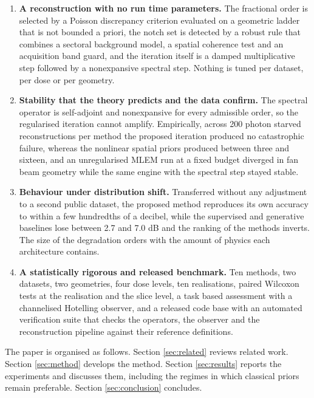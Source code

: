 \begin{enumerate}
\item \textbf{A reconstruction with no run time parameters.} The fractional
order is selected by a Poisson discrepancy criterion evaluated on a geometric
ladder that is not bounded a priori, the notch set is detected by a robust
rule that combines a sectoral background model, a spatial coherence test and
an acquisition band guard, and the iteration itself is a damped
multiplicative step followed by a nonexpansive spectral step. Nothing is
tuned per dataset, per dose or per geometry.

\item \textbf{Stability that the theory predicts and the data confirm.} The
spectral operator is self-adjoint and nonexpansive for every admissible
order, so the regularised iteration cannot amplify. Empirically, across 200
photon starved reconstructions per method the proposed iteration produced no
catastrophic failure, whereas the nonlinear spatial priors produced between
three and sixteen, and an unregularised MLEM run at a fixed budget diverged
in fan beam geometry while the same engine with the spectral step stayed
stable.

\item \textbf{Behaviour under distribution shift.} Transferred without any
adjustment to a second public dataset, the proposed method reproduces its own
accuracy to within a few hundredths of a decibel, while the supervised and
generative baselines lose between 2.7 and 7.0 dB and the ranking of the
methods inverts. The size of the degradation orders with the amount of
physics each architecture contains.

\item \textbf{A statistically rigorous and released benchmark.} Ten methods,
two datasets, two geometries, four dose levels, ten realisations, paired
Wilcoxon tests at the realisation and the slice level, a task based
assessment with a channelised Hotelling observer, and a released code base
with an automated verification suite that checks the operators, the observer
and the reconstruction pipeline against their reference definitions.
\end{enumerate}

The paper is organised as follows. Section \ref{sec:related} reviews related
work. Section \ref{sec:method} develops the method. Section
\ref{sec:results} reports the experiments and discusses them, including the
regimes in which classical priors remain preferable. Section
\ref{sec:conclusion} concludes.
